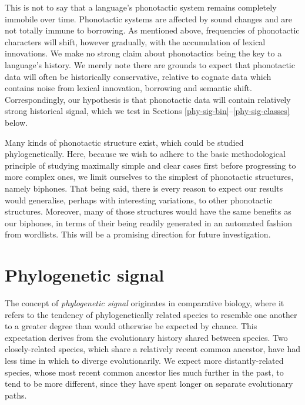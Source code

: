 This is not to say that a language's phonotactic system remains completely immobile over time. Phonotactic systems are affected by sound changes and are not totally immune to borrowing. As mentioned above, frequencies of phonotactic characters will shift, however gradually, with the accumulation of lexical innovations. We make no strong claim about phonotactics being the key to a language's history. We merely note there are grounds to expect that phonotactic data will often be historically conservative, relative to cognate data which contains noise from lexical innovation, borrowing and semantic shift. Correspondingly, our hypothesis is that phonotactic data will contain relatively strong historical signal, which we test in Sections \ref{phy-sig-bin}--\ref{phy-sig-classes} below.

Many kinds of phonotactic structure exist, which could be studied phylogenetically. Here, because we wish to adhere to the basic methodological principle of studying maximally simple and clear cases first before progressing to more complex ones, we limit ourselves to the simplest of phonotactic structures, namely biphones. That being said, there is every reason to expect our results would generalise, perhaps with interesting variations, to other phonotactic structures. Moreover, many of those structures would have the same benefits as our biphones, in terms of their being readily generated in an automated fashion from wordlists. This will be a promising direction for future investigation.

\hypertarget{phylo-sig-overview}{%
\section{Phylogenetic signal}\label{phylo-sig-overview}}

The concept of \emph{phylogenetic signal} \autocites{blomberg_tempo_2002}[p.~717]{blomberg_testing_2003} originates in comparative biology, where it refers to the tendency of phylogenetically related species to resemble one another to a greater degree than would otherwise be expected by chance. This expectation derives from the evolutionary history shared between species. Two closely-related species, which share a relatively recent common ancestor, have had less time in which to diverge evolutionarily. We expect more distantly-related species, whose most recent common ancestor lies much further in the past, to tend to be more different, since they have spent longer on separate evolutionary paths.

